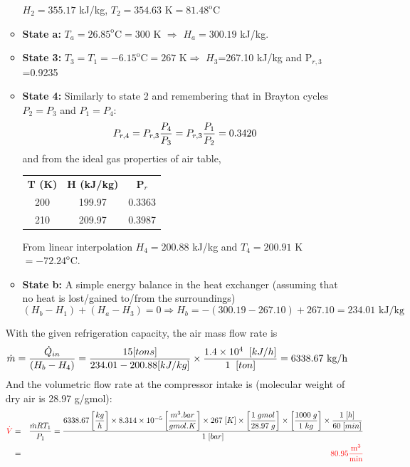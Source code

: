\begin{enumerate}
\begin{itemize}
$H_{2}=355.17$ kJ/kg, $T_{2}=354.63$ K$ = 81.48 ^{\text{o}}$C

\item {\bf State a:} $T_{a}=26.85^{\text{o}}$C$=300$ K $\Longrightarrow$ $H_{a}=300.19$ kJ/kg.

\item {\bf State 3:} $T_{3}=T_{1}=-6.15^{\text{o}}\text{C}=267\text{ K} \Longrightarrow$ $H_{3}$=267.10 kJ/kg and P$_{r,3}$=0.9235

\item {\bf State 4:} Similarly to state 2 and remembering that in Brayton cycles $P_{2}=P_{3}$ and $P_{1}=P_{4}$: 
\begin{displaymath}
P_{r,4} = P_{r,3}\displaystyle\frac{P_{4}}{P_{3}} = P_{r,3}\displaystyle\frac{P_{1}}{P_{2}} = 0.3420
\end{displaymath}
and from the ideal gas properties of air table, \\
\begin{tabular}{ c c c }
{\bf T (K)} & {\bf H (kJ/kg)}  & {\bf P$_{r}$} \\
  200       &   199.97         &    0.3363  \\
  210       &   209.97         &    0.3987 \\
\end{tabular}

From linear interpolation $H_{4}=200.88$ kJ/kg and $T_{4}=200.91$ K $= -72.24^{\text{o}}$C.

\item {\bf State b:} A simple energy balance in the heat exchanger (assuming that no heat is lost/gained to/from the surroundings)
\begin{displaymath}
\left(H_{b}-H_{1}\right) + \left(H_{a}-H_{3}\right) = 0 \Rightarrow H_{b} = -(300.19-267.10)+267.10 = 234.01 \text{ kJ/kg}
\end{displaymath}
\end{itemize}

With the given refrigeration capacity, the air mass flow rate is
\begin{displaymath}
\dot{m} = \displaystyle\frac{\dot{Q}_{in}}{\left(H_{b}-H_{4}\right)} = \displaystyle\frac{15 [tons]}{234.01-200.88 [kJ/kg]}\times \displaystyle\frac{1.4\times 10^{4}\;\;[kJ/h]}{1\;\;[ton]}=6338.67 \text{ kg/h}
\end{displaymath}
And the volumetric flow rate at the compressor intake is (molecular weight of dry air is 28.97 g/gmol):
\begin{eqnarray}
\textcolor{red}{\dot{V}} &=& \displaystyle\frac{\dot{m}RT_{1}}{P_{1}} = \displaystyle\frac{6338.67\left[\displaystyle\frac{kg}{h}\right] \times 8.314\times 10^{-5}\left[\displaystyle\frac{m^{3}.bar}{gmol.K}\right]\times 267\;[K]\times \left[\displaystyle\frac{1\;gmol}{28.97\;g}\right]\times \left[\displaystyle\frac{1000\;g}{1\;kg}\right]\times\displaystyle\frac{1\;[h]}{60\;[min]}}{1\;[bar]} \nonumber \\
&=& \textcolor{red}{80.95 \displaystyle\frac{\text{m}^{3}}{\text{min}}} \nonumber
\end{eqnarray}


\end{enumerate}
